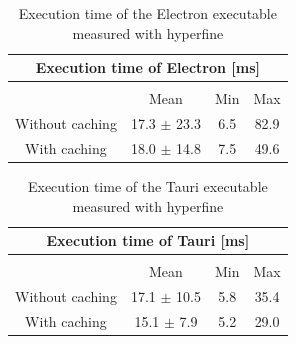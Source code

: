 \begin{table}[h]
    \begin{tabular} {| c | c | c | c |}
        \hline
        \multicolumn{4}{|c|}{Execution time of Electron [ms]} \\ \hline
        \multicolumn{4}{|c|}{}\\ \hline
        & Mean   & Min & Max     \\ \hline
        Without caching & 17.3 $\pm$ 23.3 & 6.5 & 82.9  \\ \hline
        With caching & 18.0 $\pm$ 14.8 & 7.5 & 49.6 \\ \hline
    \end{tabular}
    \caption{\label{table:exec:electron} Execution time of the Electron executable measured with hyperfine}
\end{table}
\begin{table}[h]
    \begin{tabular} {| c | c | c | c |}
        \hline
        \multicolumn{4}{|c|}{Execution time of Tauri [ms]} \\ \hline
        \multicolumn{4}{|c|}{}\\ \hline
        & Mean & Min & Max     \\ \hline
        Without caching & 17.1 $\pm$ 10.5 & 5.8 & 35.4  \\ \hline
        With caching & 15.1 $\pm$ 7.9 & 5.2 & 29.0 \\ \hline
    \end{tabular}
    \caption{\label{table:exec:tauri} Execution time of the Tauri executable measured with hyperfine}
\end{table}

